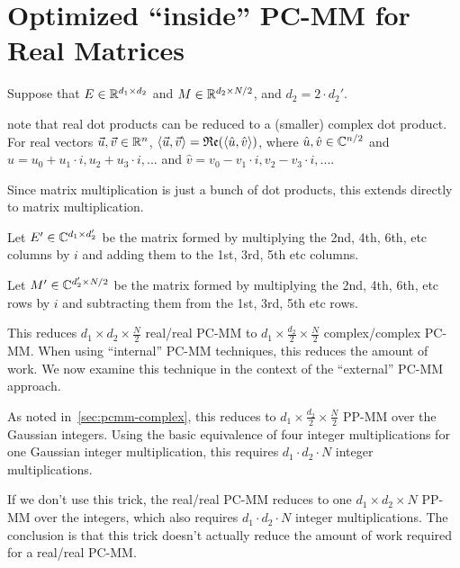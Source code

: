 \section{Optimized ``inside'' PC-MM for Real Matrices}
\label{sec:pcmm-complexification}
Suppose that $E\in \mathbb{R}^{d_1\times d_2}$ and $M\in\mathbb{R}^{d_2\times {N/2}}$, and $d_2=2\cdot d_2'$. 

\cite{KHBC+21, HPCC+21, 10.5555/3618408.3619194} note that real dot products can be reduced to a (smaller) complex dot product. For real vectors $\vec{u}, \vec{v}\in\mathbb{R}^n$, $\inner{\vec{u},\vec{v}} = \mathfrak{Re}\parens*{\inner{\hat{u}, \hat{v}}}$, where $\hat{u}, \hat{v}\in\mathbb{C}^{n/2}$ and $\hat{u} = {u_0+u_1\cdot i, u_2+u_3\cdot i, ...}$ and $\hat{v} = {v_0-v_1\cdot i, v_2-v_3\cdot i, ...}$.

Since matrix multiplication is just a bunch of dot products, this extends directly to matrix multiplication.

Let $E'\in\mathbb{C}^{d_1\times d_2'}$ be the matrix formed by multiplying the 2nd, 4th, 6th, etc columns by $i$ and adding them to the 1st, 3rd, 5th etc columns.

Let $M'\in\mathbb{C}^{d_2'\times {N/2}}$ be the matrix formed by multiplying the 2nd, 4th, 6th, etc rows by $i$ and subtracting them from the 1st, 3rd, 5th etc rows.

This reduces $d_1\times d_2\times \frac{N}{2}$ real/real PC-MM to $d_1\times \frac{d_2}{2}\times \frac{N}{2}$ complex/complex PC-MM. When using ``internal'' PC-MM techniques, this reduces the amount of work. We now examine this technique in the context of the ``external'' PC-MM approach.

As noted in~\cref{sec:pcmm-complex}, this reduces to $d_1\times \frac{d_2}{2}\times \frac{N}{2}$ PP-MM over the Gaussian integers. Using the basic equivalence of four integer multiplications for one Gaussian integer multiplication, this requires $d_1\cdot d_2\cdot N$ integer multiplications. 

If we don't use this trick, the real/real PC-MM reduces to one $d_1\times d_2\times N$ PP-MM over the integers, which also requires $d_1\cdot d_2\cdot N$ integer multiplications. The conclusion is that this trick doesn't actually reduce the amount of work required for a real/real PC-MM.